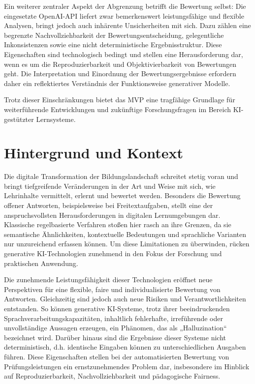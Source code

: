 \documentclass[a4paper,12pt]{article}
\begin{document}
Ein weiterer zentraler Aspekt der Abgrenzung betrifft die Bewertung selbst: Die eingesetzte OpenAI-API liefert zwar bemerkenswert leistungsfähige und flexible Analysen, bringt jedoch auch inhärente Unsicherheiten mit sich. Dazu zählen eine begrenzte Nachvollziehbarkeit der Bewertungsentscheidung, gelegentliche Inkonsistenzen sowie eine nicht deterministische Ergebnisstruktur. Diese Eigenschaften sind technologisch bedingt und stellen eine Herausforderung dar, wenn es um die Reproduzierbarkeit und Objektivierbarkeit von Bewertungen geht. Die Interpretation und Einordnung der Bewertungsergebnisse erfordern daher ein reflektiertes Verständnis der Funktionsweise generativer Modelle.

Trotz dieser Einschränkungen bietet das MVP eine tragfähige Grundlage für weiterführende Entwicklungen und zukünftige Forschungsfragen im Bereich KI-gestützter Lernsysteme.

\newpage

\section{Hintergrund und Kontext}
\label{sec:hintergrund}
Die digitale Transformation der Bildungslandschaft schreitet stetig voran und bringt tiefgreifende Veränderungen in der Art und Weise mit sich, wie Lehrinhalte vermittelt, erlernt und bewertet werden. Besonders die Bewertung offener Antworten, beispielsweise bei Freitextaufgaben, stellt eine der anspruchsvollsten Herausforderungen in digitalen Lernumgebungen dar. Klassische regelbasierte Verfahren stoßen hier rasch an ihre Grenzen, da sie semantische Ähnlichkeiten, kontextuelle Bedeutungen und sprachliche Varianten nur unzureichend erfassen können. Um diese Limitationen zu überwinden, rücken generative KI-Technologien zunehmend in den Fokus der Forschung und praktischen Anwendung.

Die zunehmende Leistungsfähigkeit dieser Technologien eröffnet neue Perspektiven für eine flexible, faire und individualisierte Bewertung von Antworten. Gleichzeitig sind jedoch auch neue Risiken und Verantwortlichkeiten entstanden. So können generative KI-Systeme, trotz ihrer beeindruckenden Sprachverarbeitungskapazitäten, inhaltlich fehlerhafte, irreführende oder unvollständige Aussagen erzeugen, ein Phänomen, das als „Halluzination“ bezeichnet wird. Darüber hinaus sind die Ergebnisse dieser Systeme nicht deterministisch, d.h. identische Eingaben können zu unterschiedlichen Ausgaben führen. Diese Eigenschaften stellen bei der automatisierten Bewertung von Prüfungsleistungen ein ernstzunehmendes Problem dar, insbesondere im Hinblick auf Reproduzierbarkeit, Nachvollziehbarkeit und pädagogische Fairness.
\end{document}
